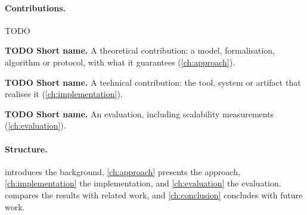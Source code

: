 \paragraph{Contributions.}
TODO
\begin{contributions}
  \item\label{c:method} \textbf{TODO Short name.} A theoretical contribution: a model, formalisation, algorithm or protocol, with what it guarantees (\cref{ch:approach}).
  \item\label{c:impl} \textbf{TODO Short name.} A technical contribution: the tool, system or artifact that realises it (\cref{ch:implementation}).
  \item\label{c:eval} \textbf{TODO Short name.} An evaluation, including scalability measurements (\cref{ch:evaluation}).
\end{contributions}

\paragraph{Structure.}
 introduces the background, \cref{ch:approach} presents the approach, \cref{ch:implementation} the implementation, and \cref{ch:evaluation} the evaluation.  compares the results with related work, and \cref{ch:conclusion} concludes with future work.
